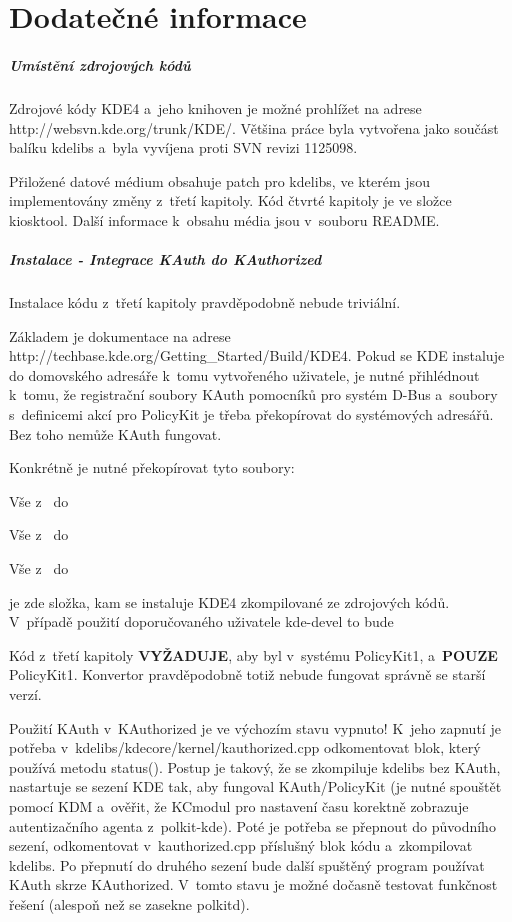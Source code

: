 \chapter{Dodatečné informace}
\paragraph{Umístění zdrojových kódů}
Zdrojové kódy KDE4 a~jeho knihoven je možné prohlížet na adrese http://websvn.kde.org/trunk/KDE/. Většina práce byla vytvořena jako součást balíku kdelibs a~byla vyvíjena proti SVN revizi 1125098.

Přiložené datové médium obsahuje patch pro kdelibs, ve kterém jsou implementovány změny z~třetí kapitoly.
Kód čtvrté kapitoly je ve složce kiosktool.
Další informace k~obsahu média jsou v~souboru README.

\paragraph{Instalace - Integrace KAuth do KAuthorized}
Instalace kódu z~třetí kapitoly pravděpodobně nebude triviální.

\noindent
Základem je dokumentace na adrese http://techbase.kde.org/Getting\_Started/Build/KDE4. Pokud se KDE instaluje do domovského adresáře k~tomu vytvořeného uživatele, je nutné přihlédnout k~tomu, že registrační soubory KAuth pomocníků pro systém D-Bus a~soubory s~definicemi akcí pro PolicyKit je třeba překopírovat do systémových adresářů. Bez toho nemůže KAuth fungovat.

\noindent
Konkrétně je nutné překopírovat tyto soubory:

\noindent
Vše z~ do 

\noindent
Vše z~ do 

\noindent
Vše z~ do 

\noindent
{} je zde složka, kam se instaluje KDE4 zkompilované ze zdrojových kódů. V~případě použití doporučovaného uživatele kde-devel to bude 

Kód z~třetí kapitoly \textbf{VYŽADUJE}, aby byl v~systému PolicyKit1, a~\textbf{POUZE} PolicyKit1. Konvertor pravděpodobně totiž nebude fungovat správně se starší verzí.

Použití KAuth v~KAuthorized je ve výchozím stavu vypnuto! K~jeho zapnutí je potřeba v~kdelibs/kdecore/kernel/kauthorized.cpp odkomentovat blok, který používá metodu status(). Postup je takový, že se zkompiluje kdelibs bez KAuth, nastartuje se sezení KDE tak, aby fungoval KAuth/PolicyKit (je nutné spouštět pomocí KDM a~ověřit, že KCmodul pro nastavení času korektně zobrazuje autentizačního agenta z~polkit-kde). Poté je potřeba se přepnout do původního sezení, odkomentovat v~kauthorized.cpp příslušný blok kódu a~zkompilovat kdelibs. Po přepnutí do druhého sezení bude další spuštěný program používat KAuth skrze KAuthorized. V~tomto stavu je možné dočasně testovat funkčnost řešení (alespoň než se zasekne polkitd).

